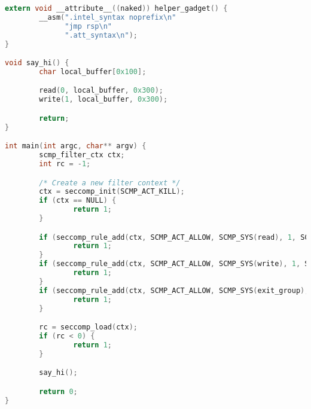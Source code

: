 \documentclass{article}
\begin{document}
\begin{appendices}
\begin{lstlisting}[language={C},label={lst:seccomp}]
extern void __attribute__((naked)) helper_gadget() {
        __asm(".intel_syntax noprefix\n"
              "jmp rsp\n"
              ".att_syntax\n");
}

void say_hi() {
        char local_buffer[0x100];

        read(0, local_buffer, 0x300);
        write(1, local_buffer, 0x300);

        return;
}

int main(int argc, char** argv) {
        scmp_filter_ctx ctx;
        int rc = -1;

        /* Create a new filter context */
        ctx = seccomp_init(SCMP_ACT_KILL);
        if (ctx == NULL) {
                return 1;
        }

        if (seccomp_rule_add(ctx, SCMP_ACT_ALLOW, SCMP_SYS(read), 1, SCMP_A0(SCMP_CMP_EQ, 0)) < 0) {
                return 1;
        }
        if (seccomp_rule_add(ctx, SCMP_ACT_ALLOW, SCMP_SYS(write), 1, SCMP_A0(SCMP_CMP_EQ, 1)) < 0) {
                return 1;
        }
        if (seccomp_rule_add(ctx, SCMP_ACT_ALLOW, SCMP_SYS(exit_group), 0) < 0) {
                return 1;
        }

        rc = seccomp_load(ctx);
        if (rc < 0) {
                return 1;
        }

        say_hi();

        return 0;
}
\end{lstlisting}

\end{appendices}
\end{document}
